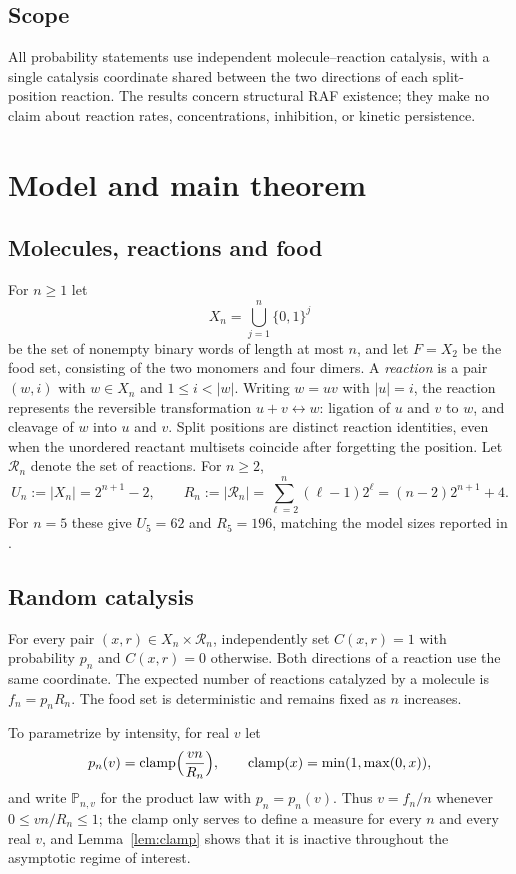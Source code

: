 \documentclass[11pt,reqno]{amsart}
\theoremstyle{plain}
\theoremstyle{definition}
\theoremstyle{remark}
\numberwithin{equation}{section}
\newcommand{\Prob}{\mathbb{P}}
\newcommand{\cR}{\mathcal{R}}
\DeclareMathOperator{\clamp}{clamp}
\begin{document}
\subsection*{Scope}
All probability statements use independent molecule--reaction catalysis, with a single catalysis coordinate shared between the two directions of each split-position reaction. The results concern structural RAF existence; they make no claim about reaction rates, concentrations, inhibition, or kinetic persistence.

\section{Model and main theorem}\label{sec:model}

\subsection{Molecules, reactions and food}
For $n\ge1$ let
\[
X_n=\bigcup_{j=1}^{n}\{0,1\}^{j}
\]
be the set of nonempty binary words of length at most $n$, and let $F=X_2$ be the food set, consisting of the two monomers and four dimers. A \emph{reaction} is a pair $(w,i)$ with $w\in X_n$ and $1\le i<|w|$. Writing $w=uv$ with $|u|=i$, the reaction represents the reversible transformation $u+v\leftrightarrow w$: ligation of $u$ and $v$ to $w$, and cleavage of $w$ into $u$ and $v$. Split positions are distinct reaction identities, even when the unordered reactant multisets coincide after forgetting the position. Let $\cR_n$ denote the set of reactions. For $n\ge2$,
\begin{equation}\label{eq:counts}
U_n:=|X_n|=2^{n+1}-2,\qquad R_n:=|\cR_n|=\sum_{\ell=2}^{n}(\ell-1)2^{\ell}=(n-2)2^{n+1}+4.
\end{equation}
For $n=5$ these give $U_5=62$ and $R_5=196$, matching the model sizes reported in \cite{hordijk2016variable}.

\subsection{Random catalysis}
For every pair $(x,r)\in X_n\times\cR_n$, independently set $C(x,r)=1$ with probability $p_n$ and $C(x,r)=0$ otherwise. Both directions of a reaction use the same coordinate. The expected number of reactions catalyzed by a molecule is $f_n=p_nR_n$. The food set is deterministic and remains fixed as $n$ increases.

To parametrize by intensity, for real $v$ let
\begin{equation}\label{eq:clamp}
p_n(v)=\clamp\Bigl(\frac{vn}{R_n}\Bigr),\qquad \clamp(x)=\min(1,\max(0,x)),
\end{equation}
and write $\Prob_{n,v}$ for the product law with $p_n=p_n(v)$. Thus $v=f_n/n$ whenever $0\le vn/R_n\le1$; the clamp only serves to define a measure for every $n$ and every real $v$, and Lemma~\ref{lem:clamp} shows that it is inactive throughout the asymptotic regime of interest.
\end{document}
